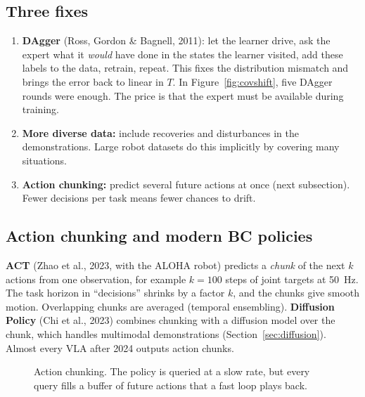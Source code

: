 \subsection{Three fixes}
\begin{enumerate}
\item \textbf{DAgger} (Ross, Gordon \& Bagnell, 2011): let the learner drive, ask the expert what it \emph{would} have done in the states the learner visited, add these labels to the data, retrain, repeat. This fixes the distribution mismatch and brings the error back to linear in $T$. In Figure~\ref{fig:covshift}, five DAgger rounds were enough. The price is that the expert must be available during training.
\item \textbf{More diverse data:} include recoveries and disturbances in the demonstrations. Large robot datasets do this implicitly by covering many situations.
\item \textbf{Action chunking:} predict several future actions at once (next subsection). Fewer decisions per task means fewer chances to drift.
\end{enumerate}

\subsection{Action chunking and modern BC policies}
\textbf{ACT} (Zhao et al., 2023, with the ALOHA robot) predicts a \emph{chunk} of the next $k$ actions from one observation, for example $k=100$ steps of joint targets at 50~Hz. The task horizon in ``decisions'' shrinks by a factor $k$, and the chunks give smooth motion. Overlapping chunks are averaged (temporal ensembling). \textbf{Diffusion Policy} (Chi et al., 2023) combines chunking with a diffusion model over the chunk, which handles multimodal demonstrations (Section~\ref{sec:diffusion}). Almost every VLA after 2024 outputs action chunks.

\begin{figure}[h]
\centering
{}
\caption{Action chunking. The policy is queried at a slow rate, but every query fills a buffer of future actions that a fast loop plays back.}
\label{fig:chunk}
\end{figure}

